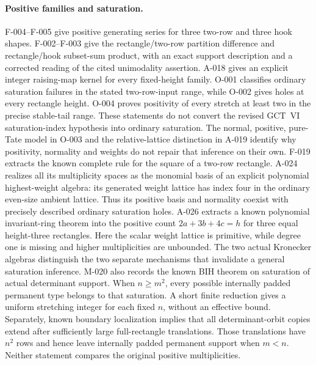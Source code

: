 \paragraph{Positive families and saturation.}
F-004--F-005 give positive generating series for three two-row
and three hook shapes. F-002--F-003 give the rectangle/two-row
partition difference and rectangle/hook subset-sum product, with an
exact support description and a corrected reading of the cited
unimodality assertion. A-018 gives an explicit integer raising-map
kernel for every fixed-height family. O-001 classifies ordinary
saturation failures in the stated two-row-input range, while O-002
gives holes at every rectangle height. O-004 proves positivity of
every stretch at least two in the precise stable-tail range.
These statements do not convert the revised GCT~VI saturation-index
hypothesis into ordinary saturation. The normal, positive, pure-Tate
model in O-003 and the relative-lattice distinction in A-019
identify why positivity, normality and weights do not repair that
inference on their own. F-019 extracts the known complete rule for
the square of a two-row rectangle. A-024 realizes all its multiplicity
spaces as the monomial basis of an explicit polynomial highest-weight
algebra: its generated weight lattice has index four in the ordinary
even-size ambient lattice. Thus its positive basis and normality
coexist with precisely described ordinary saturation holes.
A-026 extracts a known polynomial invariant-ring theorem into the
positive count \(2a+3b+4c=h\) for three equal height-three
rectangles. Here the scalar weight lattice is primitive, while
degree one is missing and higher multiplicities are unbounded.
The two actual Kronecker algebras distinguish the two separate
mechanisms that invalidate a general saturation inference.
M-020 also records the known BIH theorem on saturation of actual
determinant support. When \(n\geq m^2\), every possible internally
padded permanent type belongs to that saturation. A short finite
reduction gives a uniform stretching integer for each fixed \(n\),
without an effective bound. Separately, known boundary localization
implies that all determinant-orbit copies extend after sufficiently
large full-rectangle translations. Those translations have \(n^2\)
rows and hence leave internally padded permanent support when \(m<n\).
Neither statement compares the original positive multiplicities.

